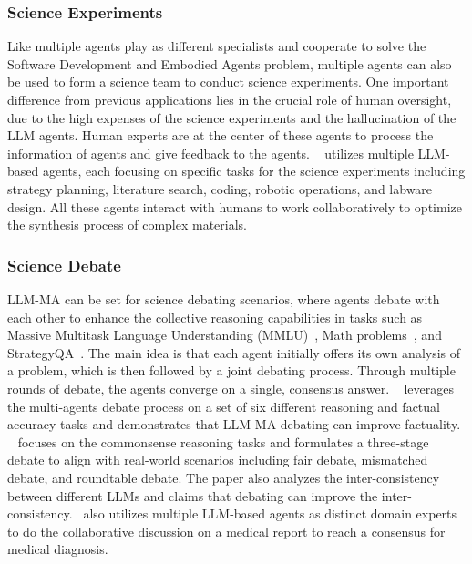 \subsubsection{Science Experiments}
Like multiple agents play as different specialists and cooperate to solve the Software Development and Embodied Agents problem, multiple agents can also be used to form a science team to conduct science experiments. One important difference from previous applications lies in the crucial role of human oversight,  due to the high expenses of the science experiments and the hallucination of the LLM agents. Human experts are at the center of these agents to process the information of agents and give feedback to the agents.
~\cite{chatgptforchem} utilizes multiple LLM-based agents, each focusing on specific tasks for the science experiments including strategy planning, literature search, coding, robotic operations, and labware design. All these agents interact with humans to work collaboratively to optimize the synthesis process of complex materials.

\subsubsection{Science Debate}
LLM-MA can be set for science debating scenarios, where agents debate with each other to enhance the collective reasoning capabilities in tasks such as Massive Multitask Language Understanding (MMLU)~\cite{hendrycks2020measuring}, Math problems~\cite{cobbe2021training}, and StrategyQA~\cite{geva2021did}. The main idea is that each agent initially offers its own analysis of a problem, which is then followed by a joint debating process. Through multiple rounds of debate, the agents converge on a single, consensus answer. 
~\cite{du2023improving} leverages the multi-agents debate process on a set of six different reasoning and factual accuracy tasks and demonstrates that LLM-MA debating can improve factuality. ~\cite{xiong2023examining} focuses on the commonsense reasoning tasks and formulates a three-stage debate to align with real-world scenarios including fair debate, mismatched debate, and roundtable debate. The paper also analyzes the inter-consistency between different LLMs and claims that debating can improve the inter-consistency.~\cite{tang2023medagents} also utilizes multiple LLM-based agents as distinct domain experts to do the collaborative discussion on a medical report to reach a consensus for medical diagnosis. 


